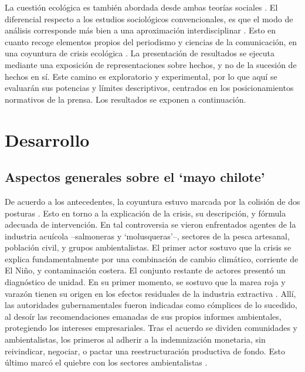 \documentclass{textolivre}
\begin{document}
La cuestión ecológica es también abordada desde ambas teorías sociales
\cite{arboleda,billi2017,Folke2016,Foster2016,Gunderson2019,Mascareo2018b}.
El diferencial
respecto a los estudios sociológicos convencionales, es que el modo de análisis
corresponde más bien a una aproximación interdisciplinar \cite{becerra2014,Osborne2015}.
Esto en cuanto recoge elementos propios del periodismo y ciencias de la
comunicación, en una coyuntura de crisis ecológica \cite{Luhmann2012}. La
presentación de resultados se ejecuta mediante una exposición de representaciones
sobre hechos, y no de la sucesión de hechos en sí. Este camino es exploratorio y
experimental, por lo que aquí se evaluarán sus potencias y límites descriptivos, centrados
en los posicionamientos normativos de la prensa. Los resultados se exponen a
continuación.




\section{Desarrollo}\label{sec-desarrollo}

\subsection{Aspectos generales sobre el ‘mayo chilote’}\label{sec-aspec-generales}
De acuerdo a los antecedentes, la coyuntura estuvo marcada por la colisión de dos
posturas \cite{Mascareo2018b}. Esto en torno a la explicación de la crisis, su
descripción, y fórmula adecuada de intervención. En tal controversia se vieron
enfrentados agentes de la industria acuícola --salmoneras y ‘molusqueras’--, sectores de
la pesca artesanal, población civil, y grupos ambientalistas. El primer actor sostuvo que la
crisis se explica fundamentalmente por una combinación de cambio climático, corriente de
El Niño, y contaminación costera. El conjunto restante de actores presentó un diagnóstico
de unidad. En su primer momento, se sostuvo que la marea roja y varazón tienen su
origen en los efectos residuales de la industria extractiva \cite{roman2016}. Allí, las
autoridades gubernamentales fueron indicadas como cómplices de lo sucedido, al desoír
las recomendaciones emanadas de sus propios informes ambientales, protegiendo los
intereses empresariales. Tras el acuerdo se dividen comunidades y ambientalistas, los
primeros al adherir a la indemnización monetaria, sin reivindicar, negociar, o pactar una
reestructuración productiva de fondo. Esto último marcó el quiebre con los sectores
ambientalistas \cite{ciudadano2016}.
\end{document}
